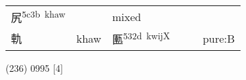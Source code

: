 \documentclass[14pt,a4paper]{scrartcl}
\begin{document}
\begin{longtable}[c]{@{}llllll@{}}
\begin{minipage}[t]{0.14\columnwidth}
尻\textsuperscript{5c3b~khaw}
\strut\end{minipage} &
\begin{minipage}[t]{0.14\columnwidth}\raggedright\strut
\strut\end{minipage} &
\begin{minipage}[t]{0.14\columnwidth}\raggedright\strut
mixed
\strut\end{minipage}\tabularnewline
\begin{minipage}[t]{0.14\columnwidth}\raggedright\strut
軌
\strut\end{minipage} &
\begin{minipage}[t]{0.14\columnwidth}\raggedright\strut
khaw
\strut\end{minipage} &
\begin{minipage}[t]{0.14\columnwidth}\raggedright\strut
匭\textsuperscript{532d~kwijX}
\strut\end{minipage} &
\begin{minipage}[t]{0.14\columnwidth}\raggedright\strut
\strut\end{minipage} &
\begin{minipage}[t]{0.14\columnwidth}\raggedright\strut
\strut\end{minipage} &
\begin{minipage}[t]{0.14\columnwidth}\raggedright\strut
pure:B
\strut\end{minipage}\tabularnewline
\bottomrule
\end{longtable}

(236) 0995 {[}4{]}
\end{document}
